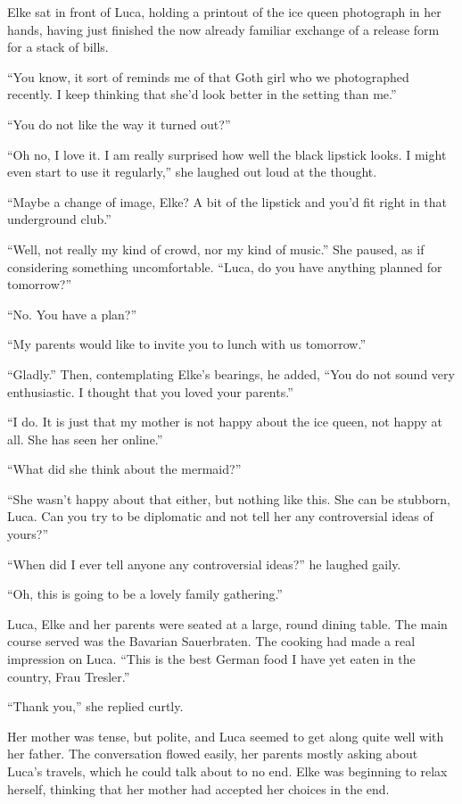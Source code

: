 \sectionline

Elke sat in front of Luca, holding a printout of the ice queen photograph in her hands, having just finished the now already familiar exchange of a release form for a stack of bills.

``You know, it sort of reminds me of that Goth girl who we photographed recently. I keep thinking that she'd look better in the setting than me.''

``You do not like the way it turned out?''

``Oh no, I love it. I am really surprised how well the black lipstick looks. I might even start to use it regularly,'' she laughed out loud at the thought.

``Maybe a change of image, Elke? A bit of the lipstick and you'd fit right in that underground club.''

``Well, not really my kind of crowd, nor my kind of music.'' She paused, as if considering something uncomfortable. ``Luca, do you have anything planned for tomorrow?''

``No. You have a plan?''

``My parents would like to invite you to lunch with us tomorrow.''

``Gladly.'' Then, contemplating Elke's bearings, he added, ``You do not sound very enthusiastic. I thought that you loved your parents.''

``I do. It is just that my mother is not happy about the ice queen, not happy at all. She has seen her online.''

``What did she think about the mermaid?''

``She wasn't happy about that either, but nothing like this. She can be stubborn, Luca. Can you try to be diplomatic and not tell her any controversial ideas of yours?''

``When did I ever tell anyone any controversial ideas?'' he laughed gaily.

``Oh, this is going to be a lovely family gathering.''

\sectionline

Luca, Elke and her parents were seated at a large, round dining table. The main course served was the Bavarian Sauerbraten. The cooking had made a real impression on Luca. ``This is the best German food I have yet eaten in the country, Frau Tresler.''

``Thank you,'' she replied curtly.

Her mother was tense, but polite, and Luca seemed to get along quite well with her father. The conversation flowed easily, her parents mostly asking about Luca's travels, which he could talk about to no end. Elke was beginning to relax herself, thinking that her mother had accepted her choices in the end.


